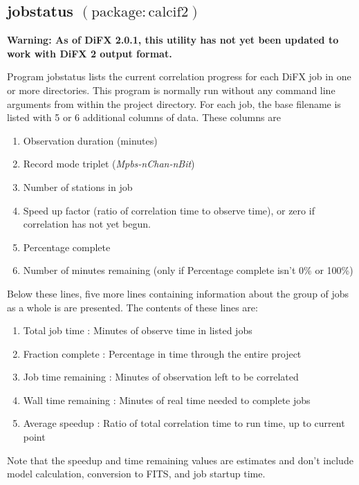 





\subsection{jobstatus {\small $\mathrm{(package: calcif2)}$}} \label{sec:jobstatus}

\noindent
{\bf Warning: As of DiFX 2.0.1, this utility has not yet been updated to work with DiFX 2 output format.}

\noindent
Program jobstatus lists the current correlation progress for each DiFX job in one or more directories.
This program is normally run without any command line arguments from within the project directory.
For each job, the base filename is listed with 5 or 6 additional columns of data.
These columns are
\begin{enumerate}
\item Observation duration (minutes)
\item Record mode triplet ({\em Mpbs-nChan-nBit})
\item Number of stations in job
\item Speed up factor (ratio of correlation time to observe time), or zero if correlation has not yet begun.
\item Percentage complete
\item Number of minutes remaining (only if Percentage complete isn't 0\% or 100\%)
\end{enumerate}
Below these lines, five more lines containing information about the group of jobs as a whole is are presented.
The contents of these lines are:
\begin{enumerate}
\item Total job time : Minutes of observe time in listed jobs
\item Fraction complete : Percentage in time through the entire project
\item Job time remaining : Minutes of observation left to be correlated
\item Wall time remaining : Minutes of real time needed to complete jobs
\item Average speedup : Ratio of total correlation time to run time, up to current point
\end{enumerate}
Note that the speedup and time remaining values are estimates and don't include model calculation, conversion to FITS, and job startup time.

